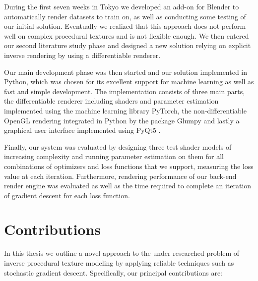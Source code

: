 During the first seven weeks in Tokyo we developed an add-on for Blender to automatically render datasets to train on, as well as conducting some testing of our initial solution. Eventually we realized that this approach does not perform well on complex procedural textures and is not flexible enough. We then entered our second literature study phase and designed a new solution relying on explicit inverse rendering by using a differentiable renderer.

Our main development phase was then started and our solution implemented in Python, which was chosen for its excellent support for machine learning as well as fast and simple development. The implementation consists of three main parts, the differentiable renderer including shaders and parameter estimation implemented using the machine learning library PyTorch, the non-differentiable OpenGL rendering integrated in Python by the package Glumpy and lastly a graphical user interface implemented using PyQt5 \cite{paszke_2019_pytorch, rougier_2011_glumpy, riverbankcomputing_2020_what}.

Finally, our system was evaluated by designing three test shader models of increasing complexity and running parameter estimation on them for all combinations of optimizers and loss functions that we support, measuring the loss value at each iteration. Furthermore, rendering performance of our back-end render engine was evaluated as well as the time required to complete an iteration of gradient descent for each loss function.

\section{Contributions}

In this thesis we outline a novel approach to the under-researched problem of inverse procedural texture modeling by applying reliable techniques such as stochastic gradient descent. Specifically, our principal contributions are:

